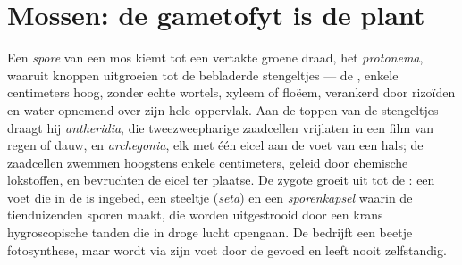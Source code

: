 \section{Mossen: de gametofyt is de plant}

\begin{definition}\label{def:b2:plant-life-cycles:moss}
Een \emph{spore} van een mos kiemt tot een vertakte groene draad, het
\emph{protonema}, waaruit knoppen uitgroeien tot de bebladerde
stengeltjes --- de \emph{}, enkele centimeters hoog, zonder
echte wortels, xyleem of floëem, verankerd door rizoïden en water
opnemend over zijn hele oppervlak. Aan de toppen van de stengeltjes
draagt hij \emph{antheridia}, die tweezweepharige zaadcellen vrijlaten in
een film van regen of dauw, en \emph{archegonia}, elk met één eicel aan
de voet van een hals; de zaadcellen zwemmen hoogstens enkele centimeters,
geleid door chemische lokstoffen, en bevruchten de eicel ter plaatse. De
zygote groeit uit tot de \emph{}: een voet die in de 
is ingebed, een steeltje (\emph{seta}) en een \emph{sporenkapsel} waarin
de  tienduizenden sporen maakt, die worden uitgestrooid door een
krans hygroscopische tanden die in droge lucht opengaan. De 
bedrijft een beetje fotosynthese, maar wordt via zijn voet door de
 gevoed en leeft nooit zelfstandig.
\end{definition}

